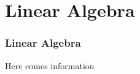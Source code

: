 \section{Linear Algebra}

\begin{frame}

\frametitle{Linear Algebra}

Here comes information


\end{frame}
